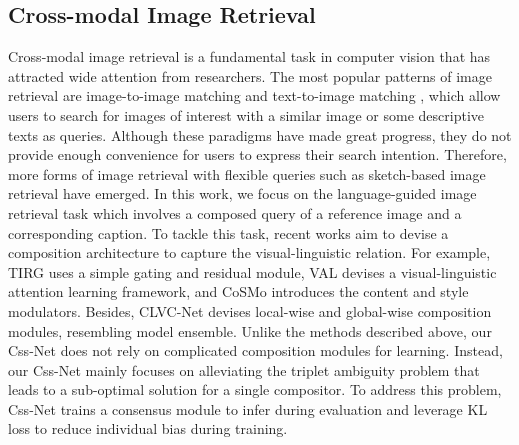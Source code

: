 \documentclass[sigconf]{acmart}
\begin{document}
\subsection{Cross-modal Image Retrieval}

Cross-modal image retrieval is a fundamental task in computer vision that has attracted wide attention from researchers. The most popular patterns of image retrieval are image-to-image matching \cite{wang2018cosface,deng2019arcface,sun2020circle,wu2017RGB,dai2018cross,liu2022learning} and text-to-image matching \cite{lee2018stacked,zhang2020context,zheng2020dual}, which allow users to search for images of interest with a similar image or some descriptive texts as queries. Although these paradigms have made great progress, they do not provide enough convenience for users to express their search intention. Therefore, more forms of image retrieval with flexible queries such as sketch-based image retrieval \cite{guo2017sketch,deng2020progressive,wang2021tcn,tian2021sketch} have emerged. In this work, we focus on the language-guided image retrieval task which involves a composed query of a reference image and a corresponding caption. To tackle this task, recent works \cite{vo2019composing,chen2020learning,yang2021cross,chen2020image,zhang2021heterogeneous,lee2021cosmo,wen2021comprehensive,gu2021image,zhao2022progressive} aim to devise a composition architecture to capture the visual-linguistic relation. For example,  TIRG \cite{vo2019composing} uses a simple gating and residual module, VAL \cite{chen2020image} devises a visual-linguistic attention learning framework, and CoSMo \cite{lee2021cosmo} introduces the content and style modulators. Besides, CLVC-Net \cite{wen2021comprehensive} devises local-wise and global-wise composition modules, resembling model ensemble.
Unlike the methods described above, our Css-Net does not rely on complicated composition modules for learning. Instead, our Css-Net mainly focuses on alleviating the triplet ambiguity problem that leads to a sub-optimal solution for a single compositor. To address this problem, Css-Net trains a consensus module to infer during evaluation and leverage KL loss to reduce individual bias during training. 
\end{document}
